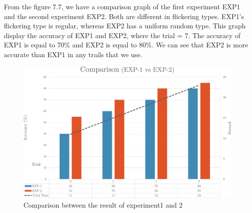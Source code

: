 From the figure 7.7, we have a comparison graph of the first experiment EXP1 and the second experiment EXP2. Both are different in flickering types. EXP1's flickering type is regular, whereas EXP2 has a uniform random type. This graph display the accuracy of EXP1 and EXP2, where the trial = 7. The accuracy of EXP1 is equal to 70\% and EXP2 is equal to 80\%. We can see that EXP2 is more accurate than EXP1 in any trails that we use.

\begin{figure}[ht]
	\centering
	\includegraphics[width=\textwidth]{chapter7/result_12.pdf}
	\caption{Comparison between the result of experiment1 and 2}
\end{figure}

